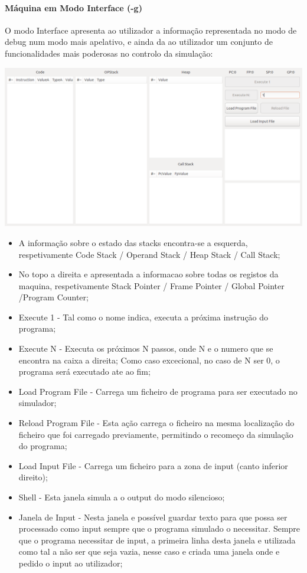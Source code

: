 \documentclass{report}
\begin{document}
\paragraph{\quad Máquina em Modo Interface (-g)}
  O modo Interface apresenta ao utilizador a informação representada no modo de debug num modo mais apelativo,
	e ainda da ao utilizador um conjunto de funcionalidades mais poderosas no controlo da simulação:

	\begin{center}
	\includegraphics[width=15cm]{gtk2.png}
	\end{center}

	\begin{itemize}
		\item A informação sobre o estado das stacks encontra-se a esquerda, respetivamente
		 Code Stack / Operand Stack / Heap Stack /	Call Stack;
		\item No topo a direita e apresentada a informacao sobre todas os registos da maquina, respetivamente
			Stack Pointer / Frame Pointer /	Global Pointer /Program Counter;
		\item Execute 1 - Tal como o nome indica, executa a próxima instrução do programa;
		\item Execute N - Executa os próximos N passos, onde N e o numero que se encontra na caixa a direita; Como caso excecional,
		no caso de N ser 0, o programa será executado ate ao fim;
		\item Load Program File - Carrega um ficheiro de programa para ser executado no simulador;
		\item Reload Program File - Esta ação carrega o ficheiro na	mesma localização do ficheiro que foi carregado previamente,
		permitindo o recomeço da simulação do programa;
		\item Load Input File - Carrega um ficheiro para a zona de input (canto inferior direito);
		\item Shell - Esta janela simula a o output do modo silencioso;
		\item Janela de Input - Nesta janela e possível guardar texto para que possa ser processado como input sempre que
		o programa simulado o necessitar. Sempre que o programa necessitar de input, a primeira linha desta janela e utilizada como tal
		a não ser que seja vazia, nesse caso e criada uma janela onde e pedido o input ao utilizador;
	\end{itemize}
\end{document}
